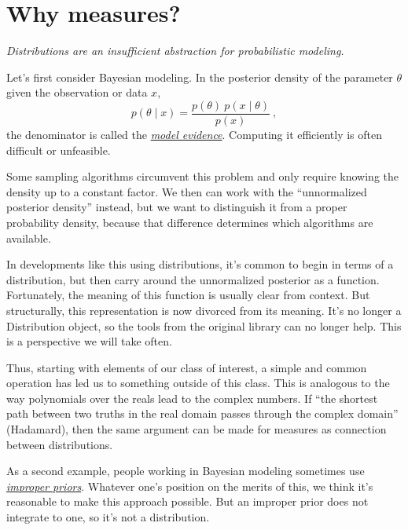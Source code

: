 \documentclass{juliacon}
\begin{document}
\section{Why measures?}

\emph{Distributions are an insufficient abstraction for probabilistic modeling.}

Let's first consider Bayesian modeling. In the posterior density of the
parameter $\theta$ given the observation or data $x$,
\[
p(\theta \mid x) = \frac{p(\theta)\ p(x \mid \theta)}{p(x)}\ ,
\]
the denominator is called the \href{https://en.wikipedia.org/wiki/Marginal_likelihood}{\emph{model evidence}}. Computing it efficiently is often difficult or unfeasible.

Some sampling algorithms circumvent this problem and only require knowing the density up to a constant factor.
We then can work with the ``unnormalized posterior density'' instead, but we want to distinguish it from a proper probability density, because that difference determines which algorithms are available.


In developments like this using distributions, it's common to begin in terms of a distribution, but then carry around the unnormalized posterior as a function. Fortunately, the meaning of this function is usually clear from context. But structurally, this representation is now divorced from its meaning. It's no longer a Distribution object, so the tools from the original library can no longer help. This is a perspective we will take often.




Thus, starting with elements of our class of interest, a simple and common operation has led us to something outside of this class. This is analogous to the way polynomials over the reals lead to the complex numbers. If ``the shortest path between two truths in the real domain passes through the complex domain'' (Hadamard), then the same argument can be made for measures as connection between distributions.



As a second example, people working in Bayesian modeling sometimes use \href{https://en.wikipedia.org/wiki/Prior_probability#Improper_priors}{\emph{improper priors}}. Whatever one's position on the merits of this, we think it's reasonable to make this approach possible. But an improper prior does not integrate to one, so it's not a distribution.
\end{document}
